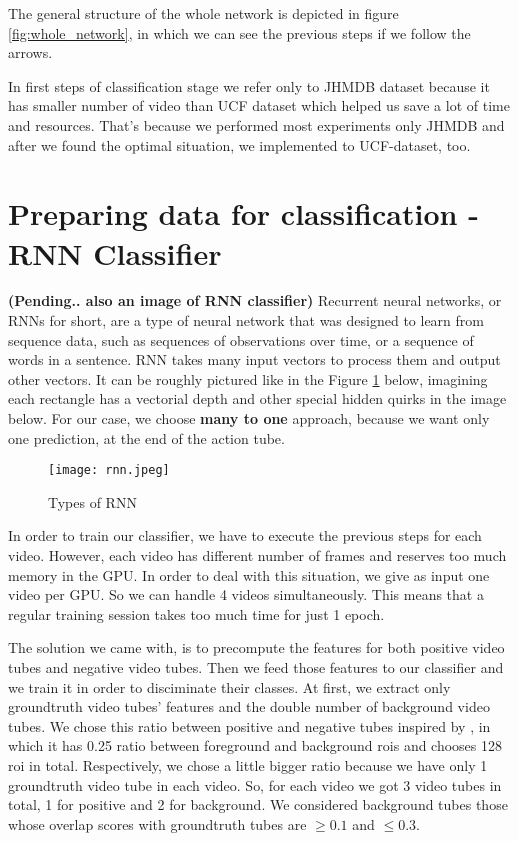 The general structure of the whole network is depicted in figure \ref{fig:whole_network}, in which we can see the previous steps if we
follow the arrows.  \par
In first steps of classification stage we refer only to JHMDB dataset because it has smaller number of video than UCF dataset which
helped us save a lot of time and resources. That's because  we performed most experiments only JHMDB and after we found the optimal
situation, we implemented to UCF-dataset, too. 

\section{Preparing data for classification -  RNN Classifier}

\textbf{(Pending.. also an image of RNN classifier)}
Recurrent neural networks, or RNNs for short, are a type of neural network that was designed to learn from sequence data,
such as sequences of observations over time, or a sequence of words in a sentence.
RNN takes many input vectors to process them and output other vectors.
It can be roughly pictured like in the Figure \ref{fig:rnn} below,
imagining each rectangle has a vectorial depth and other special hidden quirks in the image below.
For our case, we choose \textbf{many to one} approach, because we want only one prediction, at the end of
the action tube. \par
\begin{figure}[h]
  \centering
  \texttt{[image: rnn.jpeg]}
  \caption{Types of RNN}
  \label{fig:rnn}
\end{figure}



In order to train our classifier, we have to execute the previous steps for each video. However, each video
has different number of frames and reserves too much memory in the GPU. In order to deal with this situation,
we give as input one video per GPU. So we can handle 4 videos simultaneously. This means that a regular
training session takes too much time for just 1 epoch. \par
The solution we came with, is to precompute the features for both positive video tubes and negative video tubes.
Then we feed those features to our classifier and we train it in order to disciminate their classes.
At first, we extract only groundtruth video tubes' features and the double number of background video tubes. We chose this
ratio between positive and negative tubes inspired by \cite{jjfaster2rcnn}, in which it has 0.25 ratio between foreground
and background rois and chooses 128 roi in total. Respectively, we chose a little bigger ratio because we have only 1 groundtruth
video tube in each video. So, for each video we got 3 video tubes in total, 1 for positive and 2 for background. We considered
background tubes those whose overlap scores with groundtruth tubes are $ \ge 0.1 $ and $ \le 0.3 $. \par

